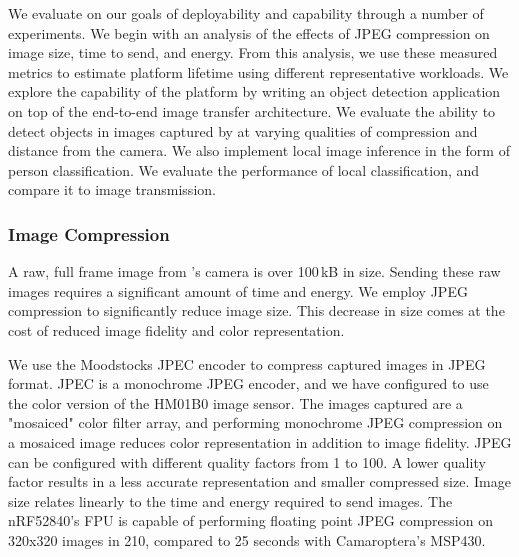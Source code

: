 We evaluate \namec{} on our goals of deployability and capability through a number of experiments. We begin with an analysis of the effects of JPEG compression on image size, time to send, and energy. From this analysis, we use these measured metrics to estimate platform lifetime using different representative workloads. 
We explore the capability of the platform by writing an object detection application on top of the \namec end-to-end image transfer architecture. We evaluate the ability to detect objects in images captured by \namec{} at varying qualities of compression and distance from the camera. We also implement local image inference in the form of person classification. We evaluate the performance of local classification, and compare it to image transmission.


\subsubsection{Image Compression}
\label{eval:compression}
A raw, full frame image from \name{}'s camera is over 100\,kB in size. Sending these raw images requires a significant amount of time and energy. We employ JPEG compression to significantly reduce image size. This decrease in size comes at the cost of reduced image fidelity and color representation.

We use the Moodstocks JPEC encoder to compress captured images in JPEG format. JPEC is a monochrome JPEG encoder, and we have configured \name{} to use the color version of the HM01B0 image sensor. The images captured are a "mosaiced" color filter array, and performing monochrome JPEG compression on a mosaiced image reduces color representation in addition to image fidelity. JPEG can be configured with different quality factors from 1 to 100. A lower quality factor results in a less accurate representation and smaller compressed size. Image size relates linearly to the time and energy required to send images.
The nRF52840's FPU is capable of performing floating point JPEG compression on 320x320 images in 210\ssi{\milli\second}, compared to 25 seconds with Camaroptera's MSP430. 

